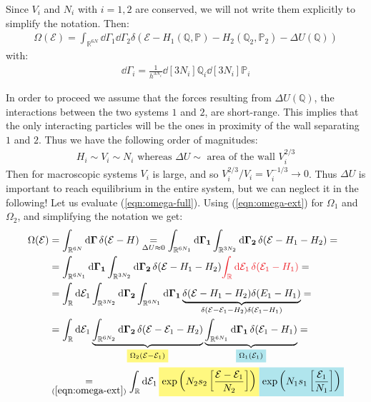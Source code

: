 \documentclass[../template.tex]{subfiles}
\begin{document}
Since $V_i$ and $N_i$ with $i=1,2$ are conserved, we will not write them explicitly to simplify the notation. Then:
\begin{align} \label{eqn:omega-full}
    \Omega(\mathcal{E}) = \int_{\mathbb{R}^{6N}} \dd{\Gamma_1} \dd{\Gamma_2} \delta(\mathcal{E}-H_1(\mathbb{Q},\mathbb{P}) - H_2(\mathbb{Q}_2, \mathbb{P}_2) - \Delta U(\mathbb{Q}))
\end{align}
with:
\begin{align*}
    \dd{\Gamma_i} = \frac{1}{h^{3N_i}} \dd[3N_i] \mathbb{Q}_i \dd[3N_i] \mathbb{P}_i
\end{align*}

In order to proceed we assume that the forces resulting from $\Delta U(\mathbb{Q})$, the interactions between the two systems $1$ and $2$, are short-range. This implies that the only interacting particles will be the ones in proximity of the wall separating $1$ and $2$. Thus we have the following order of magnitudes:
\begin{align*}
    H_i \sim V_i \sim N_i \text{ whereas } \Delta U \sim \text{ area of the wall } V_i^{2/3}
\end{align*}
Then for macroscopic systems $V_i$ is large, and so $V_i^{2/3}/V_i = V_i^{-1/3} \to 0$. Thus $\Delta U$ is important to reach equilibrium in the entire system, but we can neglect it in the following! Let us evaluate (\ref{eqn:omega-full}). Using (\ref{eqn:omega-ext}) for $\Omega_1$ and $\Omega_2$, and simplifying the notation we get:
\begin{align}\label{eqn:52}
    \Omega(\mathcal{E}) &= \int_{\mathbb{R}^{6N}} \dd{\bm{\Gamma}} \delta(\mathcal{E}-H) \underset{\Delta U \approx 0}{=} \int_{\mathbb{R}^{6N_1}} \dd{\bm{\Gamma_1}} \int_{\mathbb{R}^{3N_2}} \dd{\bm{\Gamma_2}} \delta(\mathcal{E}-H_1 - H_2) =\\ \nonumber
    &= \int_{\mathbb{R}^{6N_1}} \dd{\bm{\Gamma_1}} \int_{\mathbb{R}^{3N_2}} \dd{\bm{\Gamma_2}} \delta(\mathcal{E}-H_1 -H_2) \textcolor{Red}{\int_{\mathbb{R}} \dd{\mathcal{E}_1} \delta(\mathcal{E}_1 - H_1)} =\\ \nonumber
    &= \int_{\mathbb{R}} \dd{\mathcal{E}_1} \int_{\mathbb{R}^{3N_2}} \dd{\bm{\Gamma_2}}  \int_{\mathbb{R}^{6N_1}} \dd{\bm{\Gamma_1}} \underbrace{\delta(\mathcal{E}-H_1-H_2) \delta(E_1-H_1)}_{\delta(\mathcal{E}-\mathcal{E}_1-H_2) \delta(\mathcal{E}_1-H_1)}  =\\ \nonumber
    &= \int_{\mathbb{R}}\dd{\mathcal{E}_1} \underbrace{\int_{\mathbb{R}^{6N_2}} \dd{\bm{\Gamma_2}} \delta(\mathcal{E}-\mathcal{E}_1-H_2)}_{\hlc{Yellow}{\scriptstyle \Omega_2(\mathcal{E}-\mathcal{E}_1)}}  \underbrace{\int_{\mathbb{R}^{6N_1}} \dd{\bm{\Gamma_1}} \delta(\mathcal{E}_1 - H_1)}_{\hlc{SkyBlue}{\scriptstyle \Omega_1(\mathcal{E}_1)}} =\\ \nonumber
    &\underset{(\ref{eqn:omega-ext})}{=}  \int_{\mathbb{R}} \dd{\mathcal{E}_1} \hlc{Yellow}{\exp\left(N_2 s_2 \left[\frac{\mathcal{E}-\mathcal{E}_1}{N_2}\right] \right) }\hlc{SkyBlue}{\exp\left( N_1 s_1 \left[\frac{\mathcal{E}_1}{N_1}  \right]\right)}
\end{align}
\end{document}
